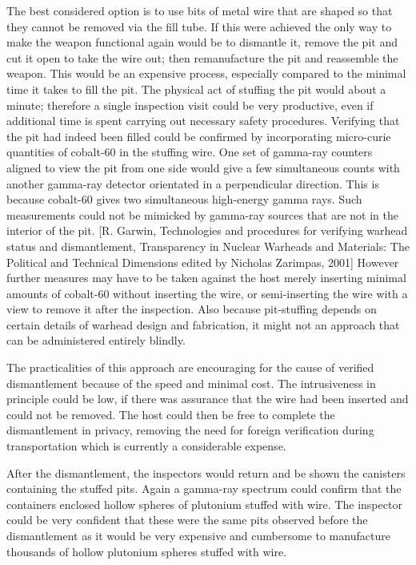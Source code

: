 \documentclass[a4paper]{article}
\begin{document}
The best considered option is to use bits of metal wire that are shaped so that 
they cannot be removed via the fill tube. 
If this were achieved the only way to make the weapon functional again would be 
to dismantle it, remove the pit and cut it open to take the wire out; then 
remanufacture the pit and reassemble the weapon. This would be an expensive 
process, especially compared to the minimal time it takes to fill the pit.
The physical act of stuffing the pit would about a minute; therefore a single 
inspection visit could be very productive, even if additional time is spent 
carrying out necessary safety procedures. 
Verifying that the pit had indeed been filled could be confirmed by incorporating 
micro-curie quantities of cobalt-60 in the stuffing wire. One set of gamma-ray 
counters aligned to view the pit from one side would give a few simultaneous 
counts with another gamma-ray detector orientated in a perpendicular direction. 
This is because cobalt-60 gives two simultaneous high-energy gamma rays. Such 
measurements could not be mimicked by gamma-ray sources that are not in the 
interior of the pit. 
[R. Garwin, Technologies and procedures for verifying warhead status and 
dismantlement, Transparency in Nuclear Warheads and Materials: The Political 
and Technical Dimensions edited by Nicholas Zarimpas, 2001]
However further measures may have to be taken against the host merely inserting 
minimal amounts of cobalt-60 without inserting the wire, or semi-inserting the 
wire with a view to remove it after the inspection. Also because pit-stuffing 
depends on certain details of warhead design and fabrication, it might not an 
approach that can be administered entirely blindly. 

The practicalities of this approach are encouraging for the cause of verified 
dismantlement because of the speed and minimal cost. The intrusiveness in 
principle could be low, if there was assurance that the wire had been inserted 
and could not be removed. The host could then be free to complete the 
dismantlement in privacy, removing the need for foreign verification during 
transportation which is currently a considerable expense.

After the dismantlement, the inspectors would return and be shown the canisters 
containing the stuffed pits. Again a gamma-ray spectrum could confirm that the 
containers enclosed hollow spheres of plutonium stuffed with wire. The inspector 
could be very confident that these were the same pits observed before the 
dismantlement as it would be very expensive and cumbersome to manufacture 
thousands of hollow plutonium spheres stuffed with wire.
\end{document}
